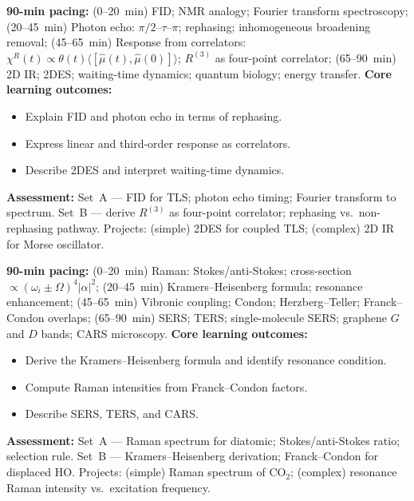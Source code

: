 \documentclass[11pt,a4paper]{article}
\begin{document}
\medskip

\begin{tcolorbox}[modulebox, title={Module~II.6 --- Lecture L09: Time-Domain Spectroscopy}]
\textbf{90-min pacing:} (0--20~min) FID; NMR analogy; Fourier transform spectroscopy; (20--45~min) Photon echo: $\pi/2$--$\tau$--$\pi$; rephasing; inhomogeneous broadening removal; (45--65~min) Response from correlators: $\chi^R(t)\propto\theta(t)\langle[\hat\mu(t),\hat\mu(0)]\rangle$; $R^{(3)}$ as four-point correlator; (65--90~min) 2D IR; 2DES; waiting-time dynamics; quantum biology; energy transfer.
\medskip\textbf{Core learning outcomes:}
\begin{itemize}[leftmargin=1.4em,topsep=2pt,itemsep=1pt]
  \item Explain FID and photon echo in terms of rephasing.
  \item Express linear and third-order response as correlators.
  \item Describe 2DES and interpret waiting-time dynamics.
\end{itemize}
\medskip\textbf{Assessment:}
Set~A --- FID for TLS; photon echo timing; Fourier transform to spectrum.
Set~B --- derive $R^{(3)}$ as four-point correlator; rephasing vs.\ non-rephasing pathway.
Projects: (simple) 2DES for coupled TLS; (complex) 2D IR for Morse oscillator.
\end{tcolorbox}

\medskip

\begin{tcolorbox}[modulebox, title={Module~II.6 --- Lecture L10: Raman and Resonance Raman Spectroscopy}]
\textbf{90-min pacing:} (0--20~min) Raman: Stokes/anti-Stokes; cross-section $\propto(\omega_i\pm\Omega)^4|\alpha|^2$; (20--45~min) Kramers--Heisenberg formula; resonance enhancement; (45--65~min) Vibronic coupling; Condon; Herzberg--Teller; Franck--Condon overlaps; (65--90~min) SERS; TERS; single-molecule SERS; graphene $G$ and $D$ bands; CARS microscopy.
\medskip\textbf{Core learning outcomes:}
\begin{itemize}[leftmargin=1.4em,topsep=2pt,itemsep=1pt]
  \item Derive the Kramers--Heisenberg formula and identify resonance condition.
  \item Compute Raman intensities from Franck--Condon factors.
  \item Describe SERS, TERS, and CARS.
\end{itemize}
\medskip\textbf{Assessment:}
Set~A --- Raman spectrum for diatomic; Stokes/anti-Stokes ratio; selection rule.
Set~B --- Kramers--Heisenberg derivation; Franck--Condon for displaced HO.
Projects: (simple) Raman spectrum of CO$_2$; (complex) resonance Raman intensity vs.\ excitation frequency.
\end{tcolorbox}
\end{document}
